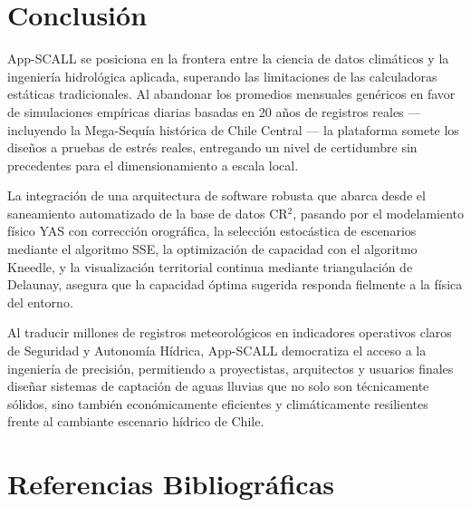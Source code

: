 \documentclass[12pt, a4paper]{article}
\begin{document}
\section{Conclusión}

App-SCALL se posiciona en la frontera entre la ciencia de datos climáticos y la ingeniería hidrológica aplicada, superando las limitaciones de las calculadoras estáticas tradicionales. Al abandonar los promedios mensuales genéricos en favor de simulaciones empíricas diarias basadas en 20 años de registros reales --- incluyendo la Mega-Sequía histórica de Chile Central --- la plataforma somete los diseños a pruebas de estrés reales, entregando un nivel de certidumbre sin precedentes para el dimensionamiento a escala local.

La integración de una arquitectura de software robusta que abarca desde el saneamiento automatizado de la base de datos CR$^2$, pasando por el modelamiento físico YAS con corrección orográfica, la selección estocástica de escenarios mediante el algoritmo SSE, la optimización de capacidad con el algoritmo Kneedle, y la visualización territorial continua mediante triangulación de Delaunay, asegura que la capacidad óptima sugerida responda fielmente a la física del entorno.

Al traducir millones de registros meteorológicos en indicadores operativos claros de Seguridad y Autonomía Hídrica, App-SCALL democratiza el acceso a la ingeniería de precisión, permitiendo a proyectistas, arquitectos y usuarios finales diseñar sistemas de captación de aguas lluvias que no solo son técnicamente sólidos, sino también económicamente eficientes y climáticamente resilientes frente al cambiante escenario hídrico de Chile.

\section*{Referencias Bibliográficas}
\end{document}
